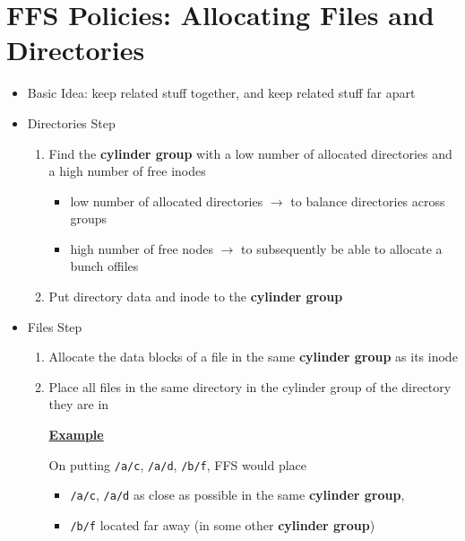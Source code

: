 \documentclass[12pt]{article}
\begin{document}
\section{FFS Policies: Allocating Files and Directories}

\begin{itemize}
    \item Basic Idea: keep related stuff together, and keep related stuff
    far apart
    \item Directories Step

    \begin{enumerate}[1)]
        \item Find the \textbf{cylinder group} with a low number of allocated directories
        and a high number of free inodes

        \begin{itemize}
            \item low number of allocated directories $\to$ to balance directories
            across groups
            \item high number of free nodes $\to$ to subsequently be able to allocate a bunch offiles
        \end{itemize}
        \item Put directory data and inode to the \textbf{cylinder group}
    \end{enumerate}

    \item Files Step

    \begin{enumerate}[1)]
        \item Allocate the data blocks of a file in the same \textbf{cylinder group} as its inode
        \item Place all files in the same directory in the cylinder group of the directory they are in

        \bigskip

        \underline{\textbf{Example}}

        \bigskip

        On putting \texttt{/a/c}, \texttt{/a/d}, \texttt{/b/f}, FFS would place

        \begin{itemize}
            \item \texttt{/a/c}, \texttt{/a/d} as close as possible in the same \textbf{cylinder group},
            \item \texttt{/b/f} located far away (in some other \textbf{cylinder group})
        \end{itemize}
    \end{enumerate}
\end{itemize}
\end{document}
